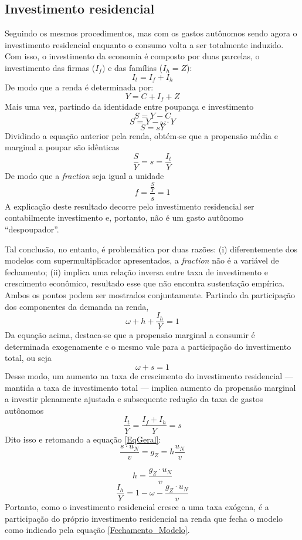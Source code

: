 \subsection{Investimento residencial}

Seguindo os mesmos procedimentos, mas com os gastos autônomos sendo agora o investimento residencial enquanto o consumo volta a ser totalmente induzido. Com isso, o investimento da economia é composto por duas parcelas, o investimento das firmas ($I_f$) e das famílias ($I_h = Z$):
$$
I_t = I_f + I_h
$$
De modo que a renda é determinada por:
$$
Y = C + I_f + Z
$$
Mais uma vez, partindo da identidade entre poupança e investimento
$$
S = Y - C
$$
$$
S = Y -  \omega\cdot Y
$$
$$
S = sY
$$
Dividindo a equação anterior pela renda, obtém-se que a propensão média e marginal a poupar são idênticas
$$
\frac{S}{Y} = s = \frac{I_t}{Y}
$$
De modo que a \textit{fraction} seja igual a unidade
$$
f = \frac{\frac{S}{Y}}{s} = 1
$$
A explicação deste resultado decorre pelo investimento residencial ser contabilmente investimento e, portanto, não é um gasto autônomo ``despoupador''. 

Tal conclusão, no entanto, é problemática por duas razões: (i) diferentemente dos modelos com supermultiplicador apresentados, a \textit{fraction} não é a variável de fechamento; (ii) implica uma relação inversa entre taxa de investimento e crescimento econômico, resultado esse que não encontra sustentação empírica. Ambos os pontos podem ser mostrados conjuntamente. Partindo da participação dos componentes da demanda na renda,
$$
\omega + h + \frac{I_h}{Y} = 1
$$
Da equação acima, destaca-se que a propensão marginal a consumir é determinada exogenamente e o mesmo vale para a participação do investimento total, ou seja
$$
 \omega +  s = 1
$$
Desse modo, um aumento na taxa de crescimento do investimento residencial --- mantida a taxa de investimento total --- implica aumento da propensão marginal a investir plenamente ajustada e subsequente redução da taxa de gastos autônomos
$$
\frac{I_t}{Y} = \frac{I_f + I_h}{Y} = s
$$
Dito isso e retomando a equação \ref{EqGeral}:
$$
\frac{ s\cdot  u_N}{v} =  g_Z = h\frac{ u_N}{ v}
$$

\begin{equation}
h = \frac{ g_Z\cdot  u_N}{ v}
\end{equation}
\begin{equation}
    \label{Fechamento_Modelo}
\frac{I_h}{Y} = 1 - \omega - \frac{ g_Z\cdot  u_N}{ v}
\end{equation}
Portanto, como o investimento residencial cresce a uma taxa exógena, é a participação do próprio investimento residencial na renda que fecha o modelo como indicado pela equação \ref{Fechamento_Modelo}. 

